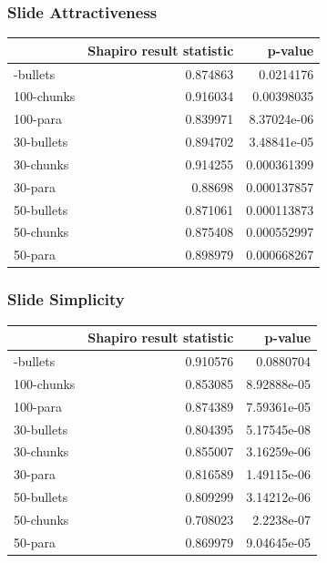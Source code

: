 \documentclass[
  letterpaper,
  DIV=11,
  numbers=noendperiod]{scrartcl}
\newcounter{none} %
\begin{document}
\subsubsection{Slide Attractiveness}\label{slide-attractiveness}

{\def\LTcaptype{none} %
\begin{longtable}[]{@{}lrr@{}}
\toprule\noalign{}
& Shapiro result statistic & p-value \\
\midrule\noalign{}
\endhead
\bottomrule\noalign{}
\endlastfoot
100-bullets & 0.874863 & 0.0214176 \\
100-chunks & 0.916034 & 0.00398035 \\
100-para & 0.839971 & 8.37024e-06 \\
30-bullets & 0.894702 & 3.48841e-05 \\
30-chunks & 0.914255 & 0.000361399 \\
30-para & 0.88698 & 0.000137857 \\
50-bullets & 0.871061 & 0.000113873 \\
50-chunks & 0.875408 & 0.000552997 \\
50-para & 0.898979 & 0.000668267 \\
\end{longtable}
}

\subsubsection{Slide Simplicity}\label{slide-simplicity}

{\def\LTcaptype{none} %
\begin{longtable}[]{@{}lrr@{}}
\toprule\noalign{}
& Shapiro result statistic & p-value \\
\midrule\noalign{}
\endhead
\bottomrule\noalign{}
\endlastfoot
100-bullets & 0.910576 & 0.0880704 \\
100-chunks & 0.853085 & 8.92888e-05 \\
100-para & 0.874389 & 7.59361e-05 \\
30-bullets & 0.804395 & 5.17545e-08 \\
30-chunks & 0.855007 & 3.16259e-06 \\
30-para & 0.816589 & 1.49115e-06 \\
50-bullets & 0.809299 & 3.14212e-06 \\
50-chunks & 0.708023 & 2.2238e-07 \\
50-para & 0.869979 & 9.04645e-05 \\
\end{longtable}
}
\end{document}
